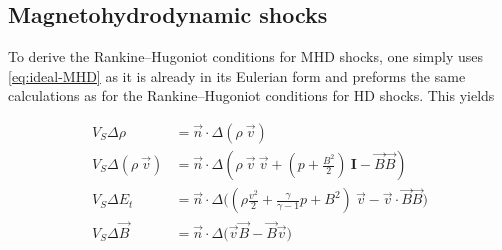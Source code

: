 \subsection*{Magnetohydrodynamic shocks}

To derive the Rankine–Hugoniot conditions for MHD shocks, one simply uses \autoref{eq:ideal-MHD} as it is already in its Eulerian form and preforms the same calculations as for the Rankine–Hugoniot conditions for HD shocks. This yields

\begin{equation}
\label{eq:MHD-shock-conditions}
\begin{split}
V_S \Delta \rho &= \vec{n}\cdot\Delta(\rho \ \vec{v})\\
V_S \Delta (\rho \ \vec{v}) &= \vec{n} \cdot \Delta(\rho \ \vec{v} \ \vec{v} + (p + \frac{B^2}{2}) \ \textbf{I} -  \vec{B}\vec{B}) \\
V_S \Delta E_t &= \vec{n} \cdot \Delta \big( (\rho \frac{v^2}{2} + \frac{\gamma}{\gamma - 1} p + B^2) \ \vec{v} - \vec{v} \cdot \vec{B} \vec{B} \big) \\
V_S \Delta \vec{B} &= \vec{n} \cdot \Delta \big( \vec{v} \vec{B} - \vec{B} \vec{v} \big)
\end{split}
\end{equation}
